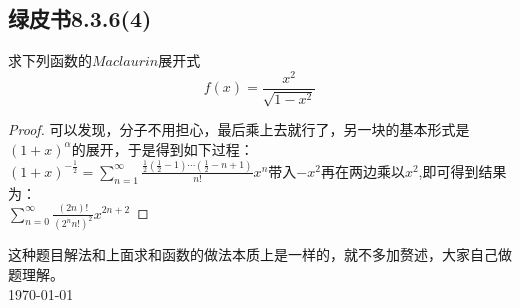 \documentclass[UTF8]{ctexart}
\begin{document}
\subsection{绿皮书8.3.6(4)}
求下列函数的$Maclaurin$展开式
$$f(x)=\frac{x^2}{\sqrt{1-x^2}}$$
\begin{proof}
	可以发现，分子不用担心，最后乘上去就行了，另一块的基本形式是$(1+x)^\alpha$的展开，于是得到如下过程：
	$(1+x)^{-\frac{1}{2}}=\sum_{n=1}^{\infty} \frac{\frac{1}{2}(\frac{1}{2}-1)\cdots (\frac{1}{2} - n + 1)}{n!}x^n$带入$-x^2$再在两边乘以$x^2$,即可得到结果为：\\
	$\sum_{n=0}^{\infty} \frac{(2n)!}{(2^nn!)^2}x^{2n+2}$
\end{proof}
这种题目解法和上面求和函数的做法本质上是一样的，就不多加赘述，大家自己做题理解。\\
\today
\end{document}
